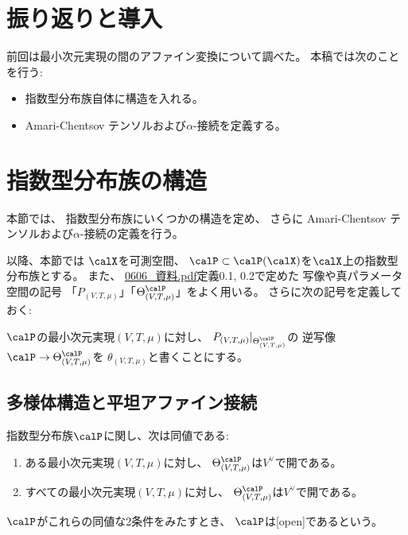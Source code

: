 \documentclass[report]{jlreq}
\begin{document}
%

%
\section*{振り返りと導入}

前回は最小次元実現の間のアファイン変換について調べた。
本稿では次のことを行う:
\begin{itemize}
    \item 指数型分布族自体に構造を入れる。
    \item Amari-Chentsov テンソルおよび$\alpha$-接続を定義する。
\end{itemize}

%
\section{指数型分布族の構造}

本節では、
指数型分布族にいくつかの構造を定め、
さらに Amari-Chentsov テンソルおよび$\alpha$-接続の定義を行う。

以降、本節では
$\calX$を可測空間、
$\calP \subset \calP(\calX)$を$\calX$上の指数型分布族とする。
また、
\url{0606_資料.pdf}定義0.1, 0.2で定めた
写像や真パラメータ空間の記号
「$P_{(V, T, \mu)}$」「$\Theta^\calP_{(V, T, \mu)}$」をよく用いる。
さらに次の記号を定義しておく:

\begin{definition}
    $\calP$の最小次元実現$(V, T, \mu)$に対し、
    $P_{(V, T, \mu)}|_{\Theta^\calP_{(V, T, \mu)}}$の
    逆写像$\calP \to \Theta^\calP_{(V, T, \mu)}$を
    $\theta_{(V, T, \mu)}$と書くことにする。
\end{definition}

\subsection{多様体構造と平坦アファイン接続}

\begin{propdef}
    指数型分布族$\calP$に関し、次は同値である:
    \begin{enumerate}
        \item ある最小次元実現$(V, T, \mu)$に対し、
            $\Theta^\calP_{(V, T, \mu)}$は$V^\vee$で開である。
        \item すべての最小次元実現$(V, T, \mu)$に対し、
            $\Theta^\calP_{(V, T, \mu)}$は$V^\vee$で開である。
    \end{enumerate}
    $\calP$がこれらの同値な2条件をみたすとき、
    $\calP$は[open]であるという。
\end{propdef}
\end{document}
